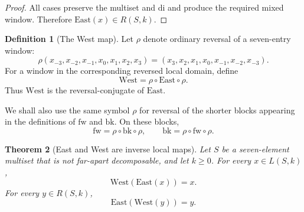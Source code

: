 \documentclass[11pt]{article}
\theoremstyle{plain}
\newtheorem{theorem}{Theorem}[section]
\theoremstyle{definition}
\newtheorem{definition}[theorem]{Definition}
\theoremstyle{remark}
\newcommand{\di}{\mathrm{di}}
\begin{document}
\begin{proof}
All cases preserve the multiset and \(\di\) and produce the required mixed
window. Therefore \(\mathrm{East}(x)\in R(S,k)\).
\end{proof}

\begin{definition}[The West map]
\label{def:west}
Let \(\rho\) denote ordinary reversal of a seven-entry window:
\[
  \rho(x_{-3},x_{-2},x_{-1},x_0,x_1,x_2,x_3)
  =(x_3,x_2,x_1,x_0,x_{-1},x_{-2},x_{-3}).
\]
For a window in the corresponding reversed local domain, define
\[
  \mathrm{West}=\rho\circ \mathrm{East}\circ \rho.
\]
Thus \(\mathrm{West}\) is the reversal-conjugate of \(\mathrm{East}\).
\end{definition}

We shall also use the same symbol \(\rho\) for reversal of the shorter blocks
appearing in the definitions of \(\mathrm{fw}\) and \(\mathrm{bk}\). On these
blocks,
\[
  \mathrm{fw}=\rho\circ\mathrm{bk}\circ\rho,
  \qquad
  \mathrm{bk}=\rho\circ\mathrm{fw}\circ\rho.
\]

\begin{theorem}[East and West are inverse local maps]
\label{thm:east-west-inverse}
Let \(S\) be a seven-element multiset that is not far-apart decomposable, and
let \(k\ge 0\). For every \(x\in L(S,k)\),
\[
  \mathrm{West}(\mathrm{East}(x))=x.
\]
For every \(y\in R(S,k)\),
\[
  \mathrm{East}(\mathrm{West}(y))=y.
\]
\end{theorem}
\end{document}
